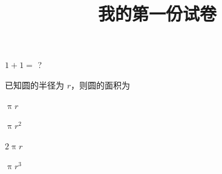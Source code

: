\documentclass{exam-zh}
\begin{document}
\title{我的第一份试卷}
\maketitle

\begin{question}
  $1 + 1 = $ ?
\end{question}

\begin{question}
  已知圆的半径为 $r$，则圆的面积为\paren[B]
  \begin{choices}
    \item $\uppi r$
    \item $\uppi r^2$
    \item $2\uppi r$
    \item $\uppi r^3$
  \end{choices}
\end{question}
\end{document}

